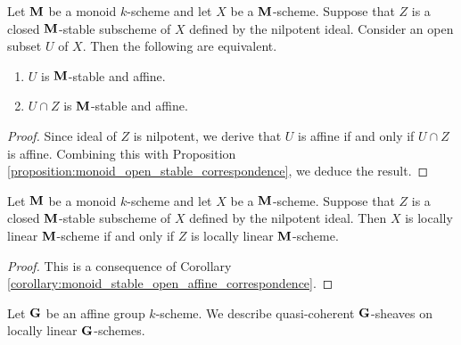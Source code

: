 \begin{corollary}\label{corollary:monoid_stable_open_affine_correspondence}
Let $\mathbf{M}$ be a monoid $k$-scheme and let $X$ be a $\mathbf{M}$-scheme. Suppose that $Z$ is a closed $\mathbf{M}$-stable subscheme of $X$ defined by the nilpotent ideal. Consider an open subset $U$ of $X$. Then the following are equivalent.
\begin{enumerate}[label=\emph{\textbf{(\arabic*)}}, leftmargin=3.0em]
\item $U$ is $\mathbf{M}$-stable and affine.
\item $U\cap Z$ is $\mathbf{M}$-stable and affine.
\end{enumerate}
\end{corollary}
\begin{proof}
Since ideal of $Z$ is nilpotent, we derive that $U$ is affine if and only if $U\cap Z$ is affine. Combining this with Proposition \ref{proposition:monoid_open_stable_correspondence}, we deduce the result.
\end{proof}

\begin{corollary}\label{corollary:locally_linear_are_stable_under_thickenings}
Let $\mathbf{M}$ be a monoid $k$-scheme and let $X$ be a $\mathbf{M}$-scheme. Suppose that $Z$ is a closed $\mathbf{M}$-stable subscheme of $X$ defined by the nilpotent ideal. Then $X$ is locally linear $\mathbf{M}$-scheme if and only if $Z$ is locally linear $\mathbf{M}$-scheme.
\end{corollary}
\begin{proof}
This is a consequence of Corollary \ref{corollary:monoid_stable_open_affine_correspondence}.
\end{proof}
\noindent
Let $\mathbf{G}$ be an affine group $k$-scheme. We describe quasi-coherent $\mathbf{G}$-sheaves on locally linear $\mathbf{G}$-schemes.

